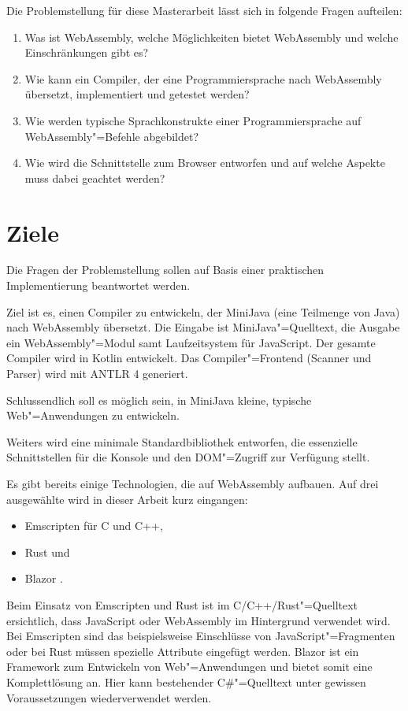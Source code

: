 Die Problemstellung für diese Masterarbeit lässt sich in folgende Fragen aufteilen:

\begin{enumerate}
	\item Was ist WebAssembly, welche Möglichkeiten bietet WebAssembly und welche Einschränkungen gibt es?
	\item Wie kann ein Compiler, der eine Programmiersprache nach WebAssembly übersetzt, implementiert und getestet werden?
	\item Wie werden typische Sprachkonstrukte einer Programmiersprache auf WebAssembly"=Befehle abgebildet?
	\item Wie wird die Schnittstelle zum Browser entworfen und auf welche Aspekte muss dabei geachtet werden?
\end{enumerate}

\section{Ziele}

Die Fragen der Problemstellung sollen auf Basis einer praktischen Implementierung beantwortet werden.

Ziel ist es, einen Compiler zu entwickeln, der MiniJava (eine Teilmenge von Java) nach WebAssembly übersetzt. Die Eingabe ist MiniJava"=Quelltext, die Ausgabe ein WebAssembly"=Modul samt Laufzeitsystem für JavaScript. Der gesamte Compiler wird in Kotlin entwickelt. Das Compiler"=Frontend (Scanner und Parser) wird mit ANTLR 4 generiert.

Schlussendlich soll es möglich sein, in MiniJava kleine, typische Web"=Anwendungen zu entwickeln.

Weiters wird eine minimale Standardbibliothek entworfen, die essenzielle Schnittstellen für die Konsole und den DOM"=Zugriff zur Verfügung stellt.

Es gibt bereits einige Technologien, die auf WebAssembly aufbauen. Auf drei ausgewählte wird in dieser Arbeit kurz eingangen:
\begin{itemize}
    \item Emscripten \cite{Emscripten} für C und C++,
    \item Rust \cite{RustWasmWebsite} und
    \item Blazor \cite{Blazor}.
\end{itemize}

Beim Einsatz von Emscripten und Rust ist im C/C++/Rust"=Quelltext ersichtlich, dass JavaScript oder WebAssembly im Hintergrund verwendet wird. Bei Emscripten sind das beispielsweise Einschlüsse von JavaScript"=Fragmenten oder bei Rust müssen spezielle Attribute eingefügt werden. Blazor ist ein Framework zum Entwickeln von Web"=Anwendungen und bietet somit eine Komplettlösung an. Hier kann bestehender C\#{}"=Quelltext unter gewissen Voraussetzungen wiederverwendet werden.

